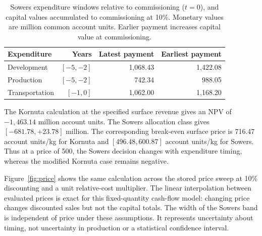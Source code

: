 \documentclass[final,5p,times,twocolumn]{elsarticle}
\begin{document}
\begin{table}[t]
\caption{Sowers expenditure windows relative to commissioning ($t=0$), and capital values accumulated to commissioning at 10\%. Monetary values are million common account units. Earlier payment increases capital value at commissioning.}
\label{tab:timing}\centering\footnotesize
\begin{tabular}{@{}lrrr@{}}\toprule
Expenditure & Years & Latest payment & Earliest payment \\
\midrule
Development & $[-5,-2]$ & 1,068.43 & 1,422.08 \\
Production & $[-5,-2]$ & 742.34 & 988.05 \\
Transportation & $[-1,0]$ & 1,062.00 & 1,168.20 \\
\bottomrule\end{tabular}\end{table}

The Kornuta calculation at the specified surface revenue gives an NPV of $-1,463.14$ million account units. The Sowers allocation class gives $[-681.78,+23.78]$ million. The corresponding break-even surface price is 716.47 account units/kg for Kornuta and $[496.48,600.87]$ account units/kg for Sowers. Thus at a price of 500, the Sowers decision changes with expenditure timing, whereas the modified Kornuta case remains negative.

Figure~\ref{fig:price} shows the same calculation across the stored price sweep at 10\% discounting and a unit relative-cost multiplier. The linear interpolation between evaluated prices is exact for this fixed-quantity cash-flow model: changing price changes discounted sales but not the capital totals. The width of the Sowers band is independent of price under these assumptions. It represents uncertainty about timing, not uncertainty in production or a statistical confidence interval.
\end{document}
